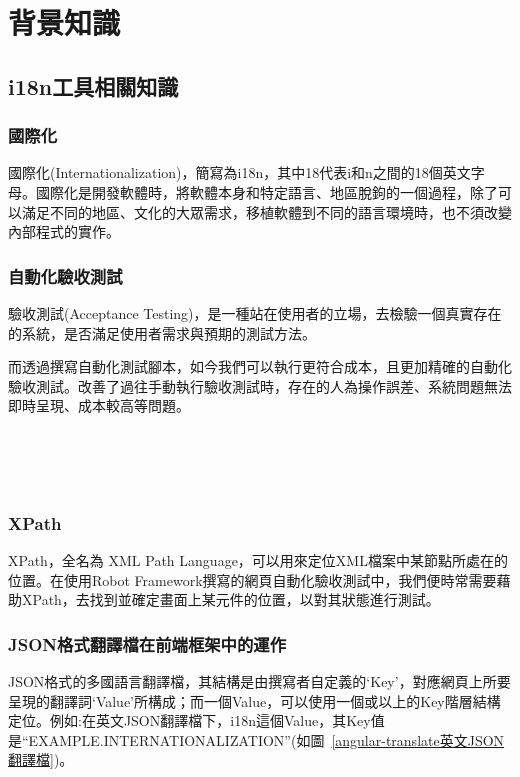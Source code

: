 \chapter{背景知識}

\section{i18n工具相關知識}

\subsection{國際化}
國際化(Internationalization)\cite{internationalization}，簡寫為i18n，其中18代表i和n之間的18個英文字母。國際化是開發軟體時，將軟體本身和特定語言、地區脫鉤的一個過程，除了可以滿足不同的地區、文化的大眾需求，移植軟體到不同的語言環境時，也不須改變內部程式的實作。

\subsection{自動化驗收測試}
驗收測試(Acceptance Testing)\cite{se}，是一種站在使用者的立場，去檢驗一個真實存在的系統，是否滿足使用者需求與預期的測試方法。

而透過撰寫自動化測試腳本\cite{AT}，如今我們可以執行更符合成本，且更加精確的自動化驗收測試。改善了過往手動執行驗收測試時，存在的人為操作誤差、系統問題無法即時呈現、成本較高等問題。

\hspace*{\fill} \\
\\ \hspace*{\fill} \\
\subsection{XPath}
XPath\cite{xpath}，全名為 XML Path Language，可以用來定位XML檔案中某節點所處在的位置。在使用Robot Framework撰寫的網頁自動化驗收測試中，我們便時常需要藉助XPath，去找到並確定畫面上某元件的位置，以對其狀態進行測試。

\subsection{JSON格式翻譯檔在前端框架中的運作}
JSON格式\cite{json}的多國語言翻譯檔，其結構是由撰寫者自定義的‘Key’，對應網頁上所要呈現的翻譯詞‘Value’所構成；而一個Value，可以使用一個或以上的Key階層結構定位。例如:在英文JSON翻譯檔下，i18n這個Value，其Key值是“EXAMPLE.INTERNATIONALIZATION”(如圖~\ref{angular-translate英文JSON翻譯檔})。

